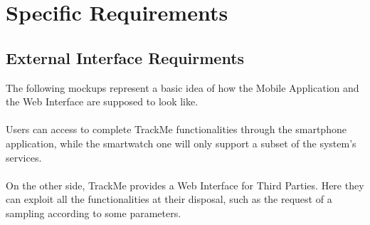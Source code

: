 \documentclass[12pt,a4paper]{article}
\begin{document}
	\newpage
	\section{Specific Requirements}
		\subsection{External Interface Requirments}
			The following mockups represent a basic idea of how the Mobile Application and the Web Interface are supposed to look like.
			\\ \\
			Users can access to complete TrackMe functionalities through the smartphone application, while the smartwatch one will only support a subset of the system's services.
			\\ \\
			On the other side, TrackMe provides a Web Interface for Third Parties. Here they can exploit all the functionalities at their disposal, such as the request of a sampling according to some parameters.
\end{document}
